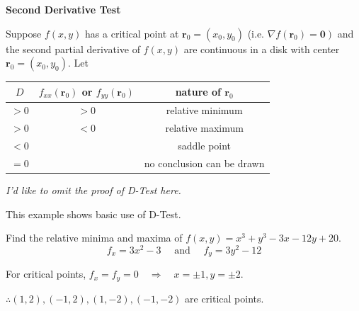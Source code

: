 \begin{spacing}{1.3}
    \vspace{0.3in}
    {\bf Second Derivative Test}

    Suppose $f(x, y)$ has a critical point at $\mathbf{r}_{0}=\left(x_{0}, y_{0}\right)$ 
    (i.e. $\left.\nabla f\left(\mathbf{r}_{0}\right)=\mathbf{0}\right)$ and the second partial 
    derivative of $f(x, y)$ are continuous in a disk with center $\mathbf{r}_{0}=\left(x_{0}, y_{0}\right) .$ Let
    \begin{center}
    \end{center}
    
    \begin{center}
        \begin{tabular}{c|c|c}
            \hline\hline 
            $D$ & $f_{x x}\left(\mathbf{r}_{0}\right)$ or $f_{y y}\left(\mathbf{r}_{0}\right)$ & nature of $\mathbf{r}_{0}$ \\\hline\hline
            $>0$ & $>0$ & relative minimum \\\hline
            $>0$ & $<0$ & relative maximum \\\hline
            $<0$ & & saddle point \\\hline
            $=0$ & & no conclusion can be drawn \\\hline
        \end{tabular}
    \end{center}
    
    \vspace{0.4in}
    {\it I'd like to omit the proof of D-Test here.}

    \newpage
    {\blue This example shows basic use of D-Test.}

    \eg Find the relative minima and maxima of $f(x, y)=x^{3}+y^{3}-3 x-12 y+20$.
    $$
    f_{x}=3 x^{2}-3 \quad \text { and } \quad f_{y}=3 y^{2}-12
    $$

    \sol 
    For critical points, $f_{x}=f_{y}=0 \quad \Rightarrow \quad x=\pm 1, y=\pm 2$.

    $\therefore (1,2),(-1,2),(1,-2),(-1,-2)$ are critical points.


\end{spacing}
